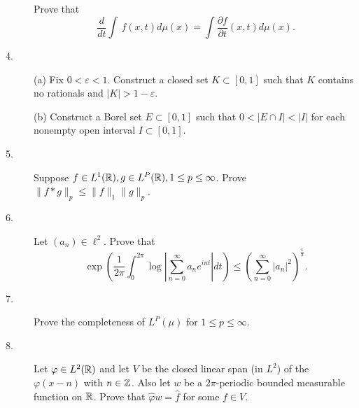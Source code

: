 \documentclass[bbb]{report}
\def\R{{\Bbb R}}
\def\Z{{\Bbb Z}}
\begin{document}
\begin{large}
\begin{description}
\item[\quad] Prove that
$$ \frac{d}{dt}\int \,f(x,t)d\mu(x)=\int\frac{\partial f}{\partial t}
   (x,t)d\mu(x). $$



\vspace{.15in}

\item[4.] (a)
Fix $0<\varepsilon< 1$. Construct a closed set $K\subset[0,1]$
such that $K$ contains no rationals and $|K|>1-\varepsilon$.

\item[\quad] (b)
Construct a Borel set $E\subset[0,1]$ such that $0< |E\cap I|<|I|$
for each nonempty open interval $I\subset[0,1]$.


\vspace{.15in}

\item[5.]
Suppose $f\in L^1(\R), g\in L^P(\R), 1\leq p\leq\infty$.
Prove $\|f\ast g\|_p\leq\|f\|_1\|g\|_p$.

\vspace{.15in}

\item[6.]
Let $(a_n)\in\ell^2$. Prove that
$$ \exp \left( \frac{1}{2\pi} \int^{2\pi}_0
   \log \left|\sum^\infty_{n=0} a_ne^{int}\right| dt \right)
   \leq \left( \sum^\infty_{n=0}|a_n|^2\right)^{\frac{1}{2}}.
   $$


\vspace{.15in}

\item[7.]
Prove the completeness of  $L^P(\mu)$ for $1\leq p\leq\infty$.


\vspace{.15in}

\item[8.]
Let $\varphi \in L^2(\R)$ and let $V$ be the closed linear span
(in $L^2$) of the $\varphi(x-n)$ with $n\in\Z$.
Also let $w$ be a $2\pi$-periodic bounded measurable function
on $\R$. Prove that $\widehat\varphi w =\widehat f$ for some $f\in V$.

\vfill



\end{description}

\end{large}
\end{document}
